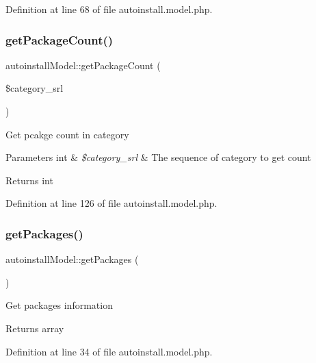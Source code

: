 Definition at line 68 of file autoinstall.\+model.\+php.

\hypertarget{classautoinstallModel_a88e07f232668549a2b68478ad42f4005}{}\label{classautoinstallModel_a88e07f232668549a2b68478ad42f4005} 
\subsubsection{\texorpdfstring{get\+Package\+Count()}{getPackageCount()}}
{\footnotesize\ttfamily autoinstall\+Model\+::get\+Package\+Count (\begin{DoxyParamCaption}\item[{}]{\$category\+\_\+srl }\end{DoxyParamCaption})}

Get pcakge count in category


\begin{DoxyParams}[1]{Parameters}
int & {\em \$category\+\_\+srl} & The sequence of category to get count \\
\hline
\end{DoxyParams}
\begin{DoxyReturn}{Returns}
int 
\end{DoxyReturn}


Definition at line 126 of file autoinstall.\+model.\+php.

\hypertarget{classautoinstallModel_a32b3e83419ad1f9a01fc95ce8f8db795}{}\label{classautoinstallModel_a32b3e83419ad1f9a01fc95ce8f8db795} 
\subsubsection{\texorpdfstring{get\+Packages()}{getPackages()}}
{\footnotesize\ttfamily autoinstall\+Model\+::get\+Packages (\begin{DoxyParamCaption}{ }\end{DoxyParamCaption})}

Get packages information

\begin{DoxyReturn}{Returns}
array 
\end{DoxyReturn}


Definition at line 34 of file autoinstall.\+model.\+php.

